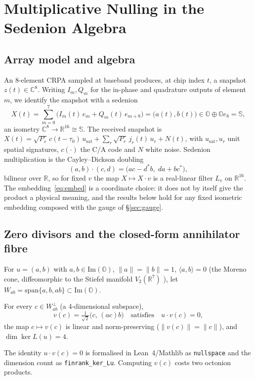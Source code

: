 \section{Multiplicative Nulling in the Sedenion Algebra}

\subsection{Array model and algebra}
An 8-element CRPA sampled at baseband produces, at chip index $t$, a snapshot
$z(t)\in\mathbb{C}^8$. Writing $I_m,Q_m$ for the in-phase and quadrature outputs of element
$m$, we identify the snapshot with a sedenion
\begin{equation}
X(t)=\sum_{m=0}^{7}\bigl(I_m(t)\,e_m+Q_m(t)\,e_{m+8}\bigr)=\bigl(a(t),b(t)\bigr)\in
\mathbb{O}\oplus\mathbb{O}e_8=\mathbb{S},
\label{eq:embed}
\end{equation}
an isometry $\mathbb{C}^8\to\mathbb{R}^{16}\cong\mathbb{S}$. The received snapshot is
$X(t)=\sqrt{P_s}\,c(t-\tau_0)\,u_{\mathrm{sat}}+\sum_r\sqrt{P_r}\,j_r(t)\,u_r+N(t)$, with
$u_{\mathrm{sat}},u_r$ unit spatial signatures, $c(\cdot)$ the C/A code and $N$ white noise.
Sedenion multiplication is the Cayley--Dickson doubling
\begin{equation}
(a,b)\cdot(c,d)=\bigl(ac-d^{*}b,\;da+bc^{*}\bigr),
\label{eq:cd}
\end{equation}
bilinear over $\mathbb{R}$, so for fixed $v$ the map $X\mapsto X\cdot v$ is a real-linear
filter $L_v$ on $\mathbb{R}^{16}$. The embedding~\eqref{eq:embed} is a coordinate choice: it
does not by itself give the product a physical meaning, and the results below hold for any
fixed isometric embedding composed with the gauge of \S\ref{sec:gauge}.

\subsection{Zero divisors and the closed-form annihilator fibre}
For $u=(a,b)$ with $a,b\in\mathrm{Im}(\mathbb{O})$, $\|a\|=\|b\|=1$, $\langle a,b\rangle=0$
(the Moreno cone, diffeomorphic to the Stiefel manifold $V_2(\mathbb{R}^7)$
\cite{moreno1998}), let $W_{ab}=\mathrm{span}\{a,b,ab\}\subset\mathrm{Im}(\mathbb{O})$.

\begin{theorem}\label{thm:fibre}
For every $c\in W_{ab}^\perp$ (a 4-dimensional subspace),
\begin{equation}
v(c)=\tfrac{1}{\sqrt2}\bigl(c,\,(ac)b\bigr)\quad\text{satisfies}\quad u\cdot v(c)=0,
\label{eq:fibre}
\end{equation}
the map $c\mapsto v(c)$ is linear and norm-preserving ($\|v(c)\|=\|c\|$), and
$\dim\ker L(u)=4$.
\end{theorem}
The identity $u\cdot v(c)=0$ is formalised in Lean~4/Mathlib as \texttt{nullspace} and the
dimension count as \texttt{finrank\_ker\_Lu}. Computing $v(c)$ costs two octonion products.

